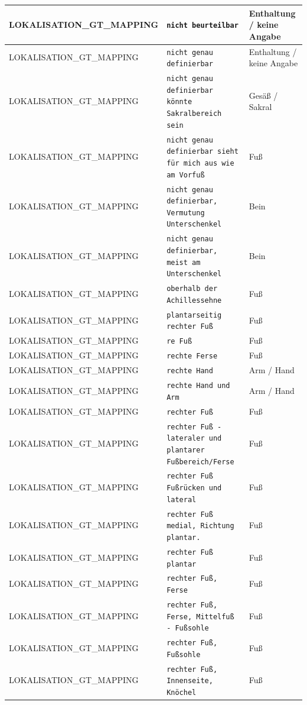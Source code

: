 \begin{longtable}{|p{3.5cm}|p{5cm}|p{6.5cm}|}
LOKALISATION\_GT\_MAPPING & \texttt{nicht beurteilbar} & Enthaltung / keine Angabe \\ \hline
LOKALISATION\_GT\_MAPPING & \texttt{nicht genau definierbar} & Enthaltung / keine Angabe \\ \hline
LOKALISATION\_GT\_MAPPING & \texttt{nicht genau definierbar könnte Sakralbereich sein} & Gesäß / Sakral \\ \hline
LOKALISATION\_GT\_MAPPING & \texttt{nicht genau definierbar sieht für mich aus wie am Vorfuß} & Fuß \\ \hline
LOKALISATION\_GT\_MAPPING & \texttt{nicht genau definierbar, Vermutung Unterschenkel} & Bein \\ \hline
LOKALISATION\_GT\_MAPPING & \texttt{nicht genau definierbar, meist am Unterschenkel} & Bein \\ \hline
LOKALISATION\_GT\_MAPPING & \texttt{oberhalb der Achillessehne} & Fuß \\ \hline
LOKALISATION\_GT\_MAPPING & \texttt{plantarseitig rechter Fuß} & Fuß \\ \hline
LOKALISATION\_GT\_MAPPING & \texttt{re Fuß} & Fuß \\ \hline
LOKALISATION\_GT\_MAPPING & \texttt{rechte Ferse} & Fuß \\ \hline
LOKALISATION\_GT\_MAPPING & \texttt{rechte Hand} & Arm / Hand \\ \hline
LOKALISATION\_GT\_MAPPING & \texttt{rechte Hand und Arm} & Arm / Hand \\ \hline
LOKALISATION\_GT\_MAPPING & \texttt{rechter Fuß} & Fuß \\ \hline
LOKALISATION\_GT\_MAPPING & \texttt{rechter Fuß - lateraler und plantarer Fußbereich/Ferse} & Fuß \\ \hline
LOKALISATION\_GT\_MAPPING & \texttt{rechter Fuß Fußrücken und lateral} & Fuß \\ \hline
LOKALISATION\_GT\_MAPPING & \texttt{rechter Fuß medial, Richtung plantar.} & Fuß \\ \hline
LOKALISATION\_GT\_MAPPING & \texttt{rechter Fuß plantar} & Fuß \\ \hline
LOKALISATION\_GT\_MAPPING & \texttt{rechter Fuß, Ferse} & Fuß \\ \hline
LOKALISATION\_GT\_MAPPING & \texttt{rechter Fuß, Ferse, Mittelfuß - Fußsohle} & Fuß \\ \hline
LOKALISATION\_GT\_MAPPING & \texttt{rechter Fuß, Fußsohle} & Fuß \\ \hline
LOKALISATION\_GT\_MAPPING & \texttt{rechter Fuß, Innenseite, Knöchel} & Fuß \\ \hline

\end{longtable}
